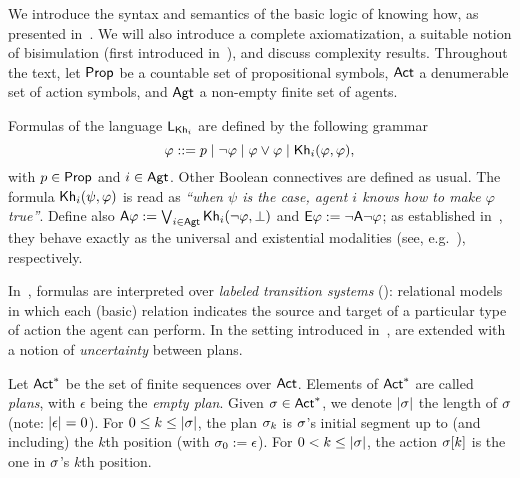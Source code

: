 We introduce the syntax and semantics of the basic logic of knowing how, as presented in~\cite{AFSVQ21}. We will also introduce a complete axiomatization, a suitable notion of bisimulation (first introduced in~\cite{AFSVQ23report}), and discuss complexity results.  
Throughout the text, let ${\rm \sf Prop}$ be a countable set of propositional symbols, ${\rm \sf Act}$ a denumerable set of action symbols, and ${\rm \sf Agt}$ a non-empty finite set of agents.

\medskip

\begin{definition}\label{def:khsyntax}
Formulas of the language $\mathsf{L}_{{\sf Kh}_i}$ are defined by the following grammar
\[
    \varphi ::= p \mid \neg\varphi \mid \varphi\vee\varphi \mid
{\sf Kh}_i(\varphi,\varphi),
\]
with $p \in {\rm \sf Prop}$ and $i\in{\rm \sf Agt}$. Other Boolean connectives are defined as
usual. The formula ${\sf Kh}_i(\psi,\varphi)$ is read as
\emph{``when $\psi$ is the case, agent $i$ knows how to make
$\varphi$ true''}.
Define also ${\sf A}\varphi:=\bigvee_{i\in{\rm \sf Agt}} {\sf Kh}_i(\neg\varphi,\bot)$ and ${\sf E}\varphi:=\neg{\sf A}\neg\varphi$; as established in~\cite{AFSVQ21}, they behave exactly as the universal and existential modalities (see, e.g.~\cite{GorankoP92}), respectively.
\end{definition}
\medskip

In~\cite{Wang15lori,Wang2016}, formulas are interpreted
over \emph{labeled transition systems} (\ltss): relational
models in which each (basic) relation indicates the source and target
of a particular type of action the agent can perform.
In the setting introduced in~\cite{AFSVQ21},  are extended with a notion of \emph{uncertainty} between plans.

\medskip

\begin{definition}
Let ${\rm \sf Act}^*$ be the set of finite sequences over ${\rm \sf Act}$. Elements of
${\rm \sf Act}^*$ are called \emph{plans}, with $\epsilon$ being the
\emph{empty plan}. %
Given $\sigma \in {\rm \sf Act}^*$, we denote $|{\sigma}|$ 
the length of $\sigma$ (note: $|{\epsilon}| = 0$). For
$0 \le k \le |{\sigma}|$, the plan $\sigma_k$ is $\sigma$'s initial
segment up to (and including) the $k$th position (with
$\sigma_0 := \epsilon$). For $0 < k \le |{\sigma}|$, the action
$\sigma[k]$ is the one in $\sigma$'s $k$th position.
\end{definition}

